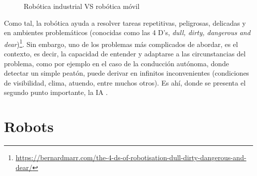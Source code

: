\begin{figure} [tp]
	\centering
	\quad
	\quad
	\caption{Robótica industrial VS robótica móvil}
	\label{fig:industrial_vs_mobile}
\end{figure}

Como tal, la robótica ayuda a resolver tareas repetitivas, peligrosas, delicadas y en ambientes problemáticos (conocidas como las 4 D's, \emph{dull, dirty, dangerous and dear})\footnote[5]{\url{https://bernardmarr.com/the-4-ds-of-robotisation-dull-dirty-dangerous-and-dear/}}. Sin embargo, uno de los problemas más complicados de abordar, es el contexto, es decir, la capacidad de entender y adaptarse a las circunstancias del problema, como por ejemplo en el caso de la conducción autónoma, donde detectar un simple peatón, puede derivar en infinitos inconvenientes (condiciones de visibilidad, clima, atuendo, entre muchos otros). Es ahí, donde se presenta el segundo punto importante, la \ac{IA} \cite{dworakowski2020robots}.\\

\section{Robots}
\label{sec:robots}

